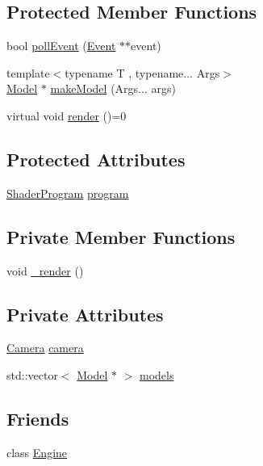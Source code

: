 \subsection*{Protected Member Functions}
\begin{DoxyCompactItemize}
\item 
bool \hyperlink{classpcs_1_1Scene_ab6c463fedfc6499998d55206aa9afeb9}{poll\+Event} (\hyperlink{classpcs_1_1Event}{Event} $\ast$$\ast$event)
\item 
{\footnotesize template$<$typename T , typename... Args$>$ }\\\hyperlink{classpcs_1_1Model}{Model} $\ast$ \hyperlink{classpcs_1_1Scene_ad1e0224b21e0ab5a4bf24e91910f5ff0}{make\+Model} (Args... args)
\item 
virtual void \hyperlink{classpcs_1_1Scene_ad1ed5ae1d53a533e2970de85093a4bc4}{render} ()=0
\end{DoxyCompactItemize}
\subsection*{Protected Attributes}
\begin{DoxyCompactItemize}
\item 
\hyperlink{classpcs_1_1ShaderProgram}{Shader\+Program} \hyperlink{classpcs_1_1Scene_ad6a29f40f29b47277475ddf971a358ec}{program}
\end{DoxyCompactItemize}
\subsection*{Private Member Functions}
\begin{DoxyCompactItemize}
\item 
void \hyperlink{classpcs_1_1Scene_ad5f0807caa705da2b3782ad4cf2619a8}{\+\_\+render} ()
\end{DoxyCompactItemize}
\subsection*{Private Attributes}
\begin{DoxyCompactItemize}
\item 
\hyperlink{classpcs_1_1Camera}{Camera} \hyperlink{classpcs_1_1Scene_ad71d97a418c46759bda1c84742ab9fd3}{camera}
\item 
std\+::vector$<$ \hyperlink{classpcs_1_1Model}{Model} $\ast$ $>$ \hyperlink{classpcs_1_1Scene_a5bdfb79b14332f23c93f930f0d14ee54}{models}
\end{DoxyCompactItemize}
\subsection*{Friends}
\begin{DoxyCompactItemize}
\item 
class \hyperlink{classpcs_1_1Scene_a3e1914489e4bed4f9f23cdeab34a43dc}{Engine}
\end{DoxyCompactItemize}

